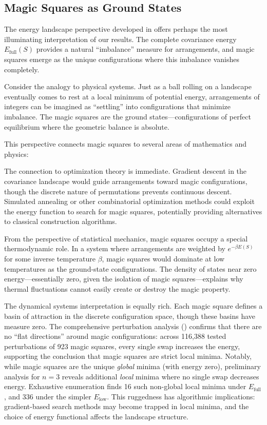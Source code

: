 \subsection{Magic Squares as Ground States}

The energy landscape perspective developed in  offers perhaps 
the most illuminating interpretation of our results.
The complete covariance energy $E_{\mathrm{full}}(S)$ provides a natural ``imbalance'' measure for arrangements,
and magic squares emerge as the unique configurations where this imbalance vanishes completely.

Consider the analogy to physical systems.
Just as a ball rolling on a landscape eventually comes to rest at a local minimum of potential energy,
arrangements of integers can be imagined as ``settling'' into configurations that minimize imbalance.
The magic squares are the ground states---configurations of perfect equilibrium 
where the geometric balance is absolute.

This perspective connects magic squares to several areas of mathematics and physics:

The connection to optimization theory is immediate.
Gradient descent in the covariance landscape would guide arrangements toward magic configurations,
though the discrete nature of permutations prevents continuous descent.
Simulated annealing or other combinatorial optimization methods could exploit the energy function
to search for magic squares, potentially providing alternatives to classical construction algorithms.

From the perspective of statistical mechanics, magic squares occupy a special thermodynamic role.
In a system where arrangements are weighted by $e^{-\beta E(S)}$ for some inverse temperature $\beta$,
magic squares would dominate at low temperatures as the ground-state configurations.
The density of states near zero energy---essentially zero, given the isolation of magic squares---explains 
why thermal fluctuations cannot easily create or destroy the magic property.

The dynamical systems interpretation is equally rich.
Each magic square defines a basin of attraction in the discrete configuration space,
though these basins have measure zero.
The comprehensive perturbation analysis () confirms that 
there are no ``flat directions'' around magic configurations:
across 116,388 tested perturbations of 923 magic squares,
every single swap increases the energy, supporting the conclusion that magic squares are strict local minima.
Notably, while magic squares are the unique \emph{global} minima (with energy zero),
preliminary analysis for $n=3$ reveals additional \emph{local} minima
where no single swap decreases energy.
Exhaustive enumeration finds 16 such non-global local minima under $E_{\mathrm{full}}$,
and 336 under the simpler $E_{\mathrm{low}}$.
This ruggedness has algorithmic implications: 
gradient-based search methods may become trapped in local minima,
and the choice of energy functional affects the landscape structure.

